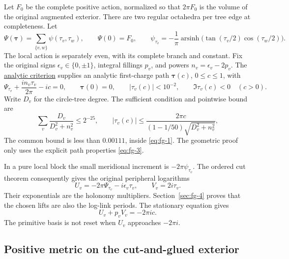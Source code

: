 Let \(F_0\) be the complete positive action, normalized so that \(2\pi F_0\) is the volume of the original augmented exterior. There are two regular octahedra per tree edge at completeness. Let
\begin{equation}
\Psi(\boldsymbol\tau)=\sum_{\{v,w\}}\psi(\tau_v,\tau_w),
 \qquad \Psi(0)=F_0,
 \qquad
 \psi_{\tau_v}=-\frac1\pi\operatorname{arsinh}
          \bigl(\tan(\tau_v/2)\cos(\tau_w/2)\bigr).
\label{eq:fg-2}
\end{equation}
The local action is separately even, with its complete branch and constant. Fix the original signs \(\epsilon_v\in\{0,\pm1\}\), integral fillings \(p_v\), and powers \(n_v=\epsilon_v-2p_v\). The \hyperref[sec:qe]{analytic criterion} supplies an analytic first-charge path \(\boldsymbol\tau(c)\), \(0\le c\le1\), with
\begin{equation}
\Psi_{\tau_v}+\frac{i n_v\tau_v}{2\pi}-ic=0,\qquad
 \boldsymbol\tau(0)=0,\qquad
 |\tau_v(c)|<10^{-2},\qquad
 \Im\tau_v(c)<0\quad(c>0).
\label{eq:fg-3}
\end{equation}
Write \(D_v\) for the circle-tree degree. The sufficient condition and pointwise bound are
\begin{equation}
\sum_v\frac{D_v}{D_v^2+n_v^2}\le2^{-25},\qquad
 |\tau_v(c)|\le
 \frac{2\pi c}{(1-1/50)\sqrt{D_v^2+n_v^2}},
\label{eq:fg-4}
\end{equation}
The common bound is less than \(0.00111\), inside \eqref{eq:fg-1}. The geometric proof only uses the explicit path properties \eqref{eq:fg-3}.

In a pure local block the small meridional increment is \(-2\pi\psi_{\tau_v}\). The ordered cut theorem consequently gives the original peripheral logarithms
\begin{equation}
U_v=-2\pi\Psi_{\tau_v}-i\epsilon_v\tau_v,
                      \qquad V_v=2i\tau_v.
\label{eq:fg-5}
\end{equation}
Their exponentials are the holonomy multipliers. Section~\ref{sec:fg-4} proves that the chosen lifts are also the log-link periods. The stationary equation gives
\begin{equation}
U_v+p_vV_v=-2\pi ic.
\label{eq:fg-6}
\end{equation}
The primitive basis is not reset when \(U_v\) approaches \(-2\pi i\).

\subsection{Positive metric on the cut-and-glued exterior}\label{sec:fg-3}

